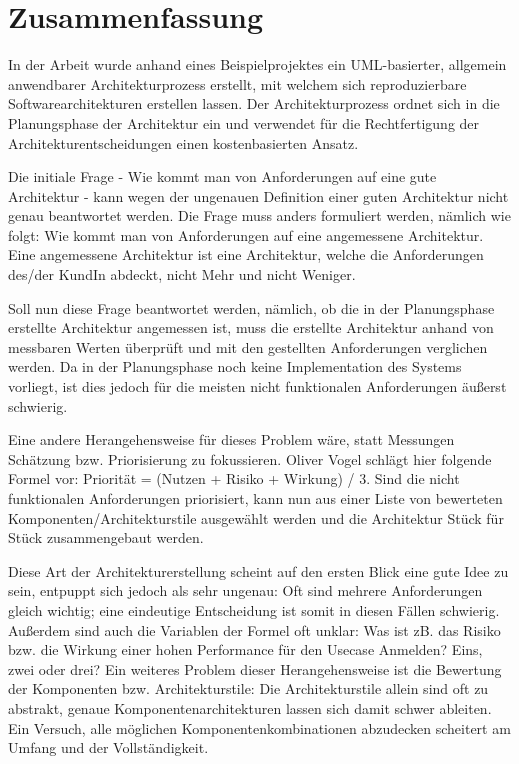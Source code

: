 \chapter{Zusammenfassung}
In der Arbeit wurde anhand eines Beispielprojektes ein UML-basierter, allgemein anwendbarer Architekturprozess erstellt, mit welchem sich reproduzierbare Softwarearchitekturen erstellen lassen. Der Architekturprozess ordnet sich in die Planungsphase der Architektur ein und verwendet für die Rechtfertigung der Architekturentscheidungen einen kostenbasierten Ansatz.

Die initiale Frage - Wie kommt man von Anforderungen auf eine gute Architektur - kann wegen der ungenauen Definition einer guten Architektur nicht genau beantwortet werden. Die Frage muss anders formuliert werden, nämlich wie folgt: Wie kommt man von Anforderungen auf eine angemessene Architektur. Eine angemessene Architektur ist eine Architektur, welche die Anforderungen des/der KundIn abdeckt, nicht Mehr und nicht Weniger.

Soll nun diese Frage beantwortet werden, nämlich, ob die in der Planungsphase erstellte Architektur angemessen ist, muss die erstellte Architektur anhand von messbaren Werten überprüft und mit den gestellten Anforderungen verglichen werden. Da in der Planungsphase noch keine Implementation des Systems vorliegt, ist dies jedoch für die meisten nicht funktionalen Anforderungen äußerst schwierig.

Eine andere Herangehensweise für dieses Problem wäre, statt Messungen Schätzung bzw. Priorisierung zu fokussieren. Oliver Vogel schlägt hier folgende Formel vor: \glqq Priorität = (Nutzen + Risiko + Wirkung) / 3\grqq \cite[S. 374]{softarch}. Sind die nicht funktionalen Anforderungen priorisiert, kann nun aus einer Liste von bewerteten Komponenten/Architekturstile ausgewählt werden \cite[S. 179]{review} und die Architektur Stück für Stück zusammengebaut werden.

Diese Art der Architekturerstellung scheint auf den ersten Blick eine gute Idee zu sein, entpuppt sich jedoch als sehr ungenau: Oft sind mehrere Anforderungen gleich wichtig; eine eindeutige Entscheidung ist somit in diesen Fällen schwierig. Außerdem sind auch die Variablen der Formel oft unklar: Was ist zB. das Risiko bzw. die Wirkung einer hohen Performance für den Usecase Anmelden? Eins, zwei oder drei? Ein weiteres Problem dieser Herangehensweise ist die Bewertung der Komponenten bzw. Architekturstile: Die Architekturstile allein sind oft zu abstrakt, genaue Komponentenarchitekturen lassen sich damit schwer ableiten. Ein Versuch, alle möglichen Komponentenkombinationen abzudecken scheitert am Umfang und der Vollständigkeit.

